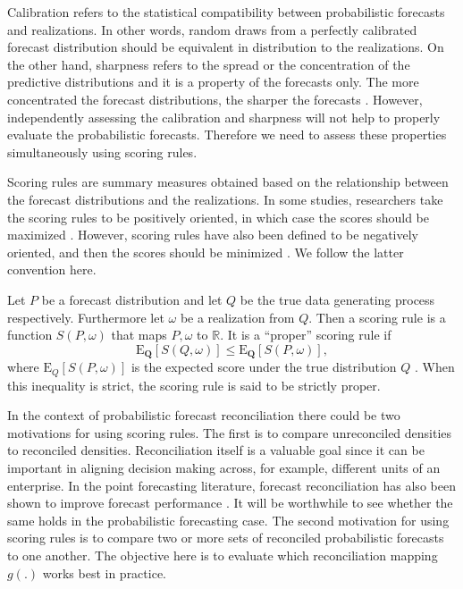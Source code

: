 \documentclass[12pt]{article}
\def\E{\text{E}}
\theoremstyle{definition}
\begin{document}
Calibration refers to the statistical compatibility between probabilistic forecasts and realizations. In other words, random draws from a perfectly calibrated forecast distribution should be equivalent in distribution to the realizations. On the other hand, sharpness refers to the spread or the concentration of the predictive distributions and it is a property of the forecasts only. The more concentrated the forecast distributions, the sharper the forecasts \citep{Gneiting2008}. However, independently assessing the calibration and sharpness will not help to properly evaluate the probabilistic forecasts. Therefore we need to assess these properties simultaneously using scoring rules.

Scoring rules are summary measures obtained based on the relationship between the forecast distributions and the realizations. In some studies, researchers take the scoring rules to be positively oriented, in which case the scores should be maximized \citep{Gneiting2007}. However, scoring rules have also been defined to be negatively oriented, and then the scores should be minimized \citep{Gneiting2014}. We follow the latter convention here.

Let $P$ be a forecast distribution and let $Q$ be the true data generating process respectively. Furthermore let $\omega$ be a realization from $Q$. Then a scoring rule is a function $S(P,\omega)$ that maps $P,\omega$ to $\mathbb{R}$. It is a ``proper'' scoring rule if
\begin{equation}\label{eq:prop_score}
\E_{\bm{Q}}[S(Q,\omega)] \le \E_{\bm{Q}}[S(P,\omega)] ,
\end{equation}
where $\E_{Q}[S(P,\omega)]$ is the expected score under the true distribution $Q$ \citep{Gneiting2008, Gneiting2014}. When this inequality is strict, the scoring rule is said to be strictly proper.

In the context of probabilistic forecast reconciliation there could be two motivations for using scoring rules. The first is to compare unreconciled densities to reconciled densities. Reconciliation itself is a valuable goal since it can be important in aligning decision making across, for example, different units of an enterprise. In the point forecasting literature, forecast reconciliation has also been shown to improve forecast performance \citep{AthEtAl2017, WicEtAl2019}. It will be worthwhile to see whether the same holds in the probabilistic forecasting case. The second motivation for using scoring rules is to compare two or more sets of reconciled probabilistic forecasts to one another. The objective here is to evaluate which reconciliation mapping $g(.)$ works best in practice.
\end{document}
